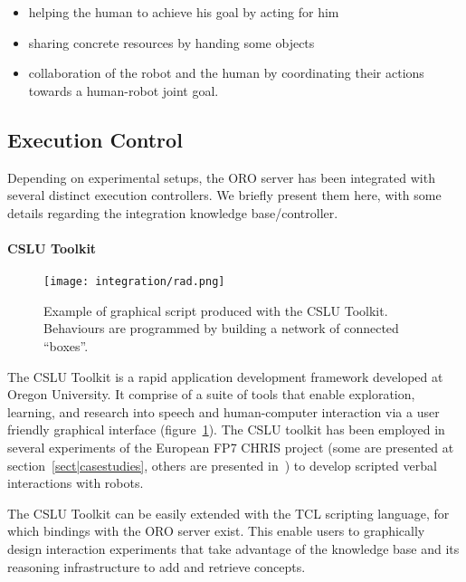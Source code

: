 \begin{itemize}

    \item helping the human to achieve his goal by acting for him

    \item sharing concrete resources by handing some objects

    \item collaboration of the robot and the human by coordinating their
    actions towards a human-robot joint goal.

\end{itemize}


\subsection{Execution Control}

Depending on experimental setups, the ORO server has been integrated with
several distinct execution controllers. We briefly present them here, with some
details regarding the integration knowledge base/controller.

\paragraph{CSLU Toolkit}
\label{sect|rad}

\begin{figure}
    \centering
    \texttt{[image: integration/rad.png]}

    \caption{Example of graphical script produced with the CSLU Toolkit.
    Behaviours are programmed by building a network of connected ``boxes''.}

    \label{fig|rad}
\end{figure}

The CSLU Toolkit is a rapid application development framework developed at
Oregon University. It comprise of a suite of tools that enable exploration,
learning, and research into speech and human-computer interaction via a user
friendly graphical interface (figure~\ref{fig|rad}). The CSLU toolkit has been
employed in several experiments of the European FP7 CHRIS project (some are
presented at section~\ref{sect|casestudies}, others are presented
in~\cite{Lallee2010, Lallee2011}) to develop scripted verbal interactions with
robots.

The CSLU Toolkit can be easily extended with the TCL scripting language, for
which bindings with the ORO server exist. This enable users to graphically
design interaction experiments that take advantage of the knowledge base and
its reasoning infrastructure to add and retrieve concepts.

